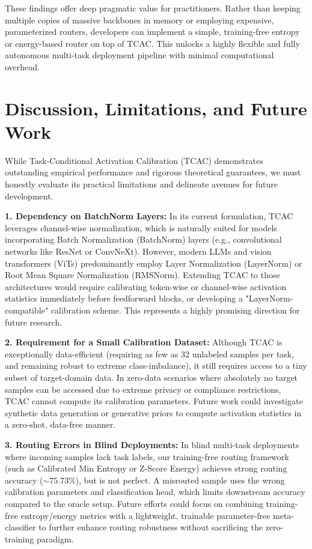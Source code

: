 \documentclass{article}
\theoremstyle{plain}
\theoremstyle{definition}
\theoremstyle{remark}
\begin{document}
These findings offer deep pragmatic value for practitioners. Rather than keeping multiple copies of massive backbones in memory or employing expensive, parameterized routers, developers can implement a simple, training-free entropy or energy-based router on top of TCAC. This unlocks a highly flexible and fully autonomous multi-task deployment pipeline with minimal computational overhead.

\section{Discussion, Limitations, and Future Work}
\label{sec:discussion_limitations}
While Task-Conditional Activation Calibration (TCAC) demonstrates outstanding empirical performance and rigorous theoretical guarantees, we must honestly evaluate its practical limitations and delineate avenues for future development.

\textbf{1. Dependency on BatchNorm Layers:} 
In its current formulation, TCAC leverages channel-wise normalization, which is naturally suited for models incorporating Batch Normalization (BatchNorm) layers (e.g., convolutional networks like ResNet or ConvNeXt). However, modern LLMs and vision transformers (ViTs) predominantly employ Layer Normalization (LayerNorm) or Root Mean Square Normalization (RMSNorm). Extending TCAC to those architectures would require calibrating token-wise or channel-wise activation statistics immediately before feedforward blocks, or developing a "LayerNorm-compatible" calibration scheme. This represents a highly promising direction for future research.

\textbf{2. Requirement for a Small Calibration Dataset:} 
Although TCAC is exceptionally data-efficient (requiring as few as 32 unlabeled samples per task, and remaining robust to extreme class-imbalance), it still requires access to a tiny subset of target-domain data. In zero-data scenarios where absolutely no target samples can be accessed due to extreme privacy or compliance restrictions, TCAC cannot compute its calibration parameters. Future work could investigate synthetic data generation or generative priors to compute activation statistics in a zero-shot, data-free manner.

\textbf{3. Routing Errors in Blind Deployments:}
In blind multi-task deployments where incoming samples lack task labels, our training-free routing framework (such as Calibrated Min Entropy or Z-Score Energy) achieves strong routing accuracy ($\sim 75.73\%$), but is not perfect. A misrouted sample uses the wrong calibration parameters and classification head, which limits downstream accuracy compared to the oracle setup. Future efforts could focus on combining training-free entropy/energy metrics with a lightweight, trainable parameter-free meta-classifier to further enhance routing robustness without sacrificing the zero-training paradigm.
\end{document}
